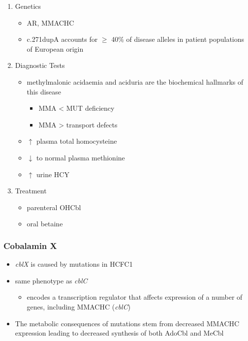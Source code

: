 \documentclass{scrartcl}
\begin{document}
\begin{enumerate}
\item Genetics
\label{sec:orgc977564}
\begin{itemize}
\item AR, MMACHC
\item c.271dupA accounts for \(\ge\) 40\% of disease alleles in patient
populations of European origin
\end{itemize}

\item Diagnostic Tests
\label{sec:orgc0fd3b0}
\begin{itemize}
\item methylmalonic acidaemia and aciduria are the
biochemical hallmarks of this disease
\begin{itemize}
\item MMA \textless{} MUT deficiency
\item MMA \textgreater{} transport defects
\end{itemize}
\item \(\uparrow\) plasma total homocysteine
\item \(\downarrow\) to normal plasma methionine
\item \(\uparrow\) urine HCY
\end{itemize}

\item Treatment
\label{sec:orgae90442}
\begin{itemize}
\item parenteral OHCbl
\item oral betaine
\end{itemize}
\end{enumerate}

\subsubsection{Cobalamin X}
\label{sec:org07e3d40}
\begin{itemize}
\item \emph{cblX} is caused by mutations in HCFC1
\item same phenotype as \emph{cblC}
\begin{itemize}
\item encodes a transcription regulator that affects expression of a
number of genes, including MMACHC (\emph{cblC})
\end{itemize}
\item The metabolic consequences of mutations stem from decreased MMACHC
expression leading to decreased synthesis of both AdoCbl and MeCbl
\end{itemize}
\end{document}
